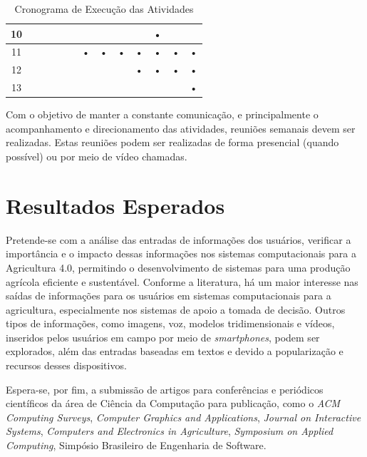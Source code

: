 \documentclass[12pt]{article}
\begin{document}
\begin{table}[htbp]
\begin{tabular}{|c|c|c|c|c|c|c|c|c|c|c|c|c|}
	10                  &            &            &           &            &            &           &            &            &           & •          &            &           \\ \hline
	11                  &            &            &           &            &            & •         & •          & •          & •         & •          & •          & •         \\ \hline
	12                  &            &            &           &            &            &           &            &            & •         & •          & •          & •         \\ \hline
	13                  &            &            &           &            &            &           &            &            &           &            &            & •         \\ \hline
	\end{tabular}
	\caption{Cronograma de Execução das Atividades}
	\label{tab:cronograma}
\end{table}

Com o objetivo de manter a constante comunicação, e principalmente o acompanhamento e direcionamento das atividades, reuniões semanais devem ser realizadas. Estas reuniões podem ser realizadas de forma presencial (quando possível) ou por meio de vídeo chamadas.

\section{Resultados Esperados}
\label{sec:resultados_esperados}

Pretende-se com a análise das entradas de informações dos usuários, verificar a importância e o impacto dessas informações nos sistemas computacionais para a Agricultura 4.0, permitindo o desenvolvimento de sistemas para uma produção agrícola eficiente e sustentável. Conforme a literatura, há um maior interesse nas saídas de informações para os usuários em sistemas computacionais para a agricultura, especialmente nos sistemas de apoio a tomada de decisão. Outros tipos de informações, como imagens, voz, modelos tridimensionais e vídeos, inseridos pelos usuários em campo por meio de \textit{smartphones}, podem ser explorados, além das entradas baseadas em textos e devido a popularização e recursos desses dispositivos.

Espera-se, por fim, a submissão de artigos para conferências e periódicos científicos da área de Ciência da Computação para publicação, como o \textit{ACM Computing Surveys}, \textit{Computer Graphics and Applications}, \textit{Journal on Interactive Systems}, \textit{Computers and Electronics in Agriculture}, \textit{Symposium on Applied Computing}, Simpósio Brasileiro de Engenharia de Software. 



\end{document}
